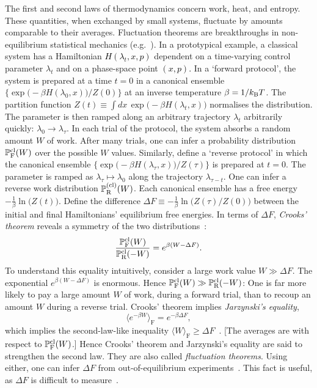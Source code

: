 \documentclass[%
 reprint,
superscriptaddress,
nofootinbib,
bibnotes,
 amsmath,amssymb,
 aps,
]{revtex4-1}
\theoremstyle{plain}
\newcommand{\Dave}[1]{\textcolor{black}{#1} }
\newcommand{\LParen}{ \bm{(} }
\newcommand{\RParen}{ \bm{)} }
\begin{document}
The first and second laws of thermodynamics concern work, heat, and entropy. These quantities, when exchanged by small systems, fluctuate by amounts comparable to their averages. Fluctuation theorems are breakthroughs in non-equilibrium statistical mechanics (e.g.~\cite{Jarzynski_equilibrium_1997, crooks_nonequilibrium_1998}).
In a prototypical example, a classical system 
has a Hamiltonian \Dave{$H(\lambda_t,x,p)$} dependent on a time-varying control parameter $\lambda_t$ and on a phase-space point \Dave{$(x,p)$.}
In a `forward protocol', the system is
prepared at a time $t=0$ in a canonical ensemble 
$\{\exp\LParen-\beta H(\lambda_0, x)\RParen/Z(0)\}$ at an inverse temperature $\beta = 1/k_{\rm B}T$. 
The partition function $Z(t)\equiv \int dx \, \exp\LParen-\beta H(\lambda_t, x)\RParen$ normalises the distribution.
The parameter is then ramped  
along an arbitrary trajectory $\lambda_t$ arbitrarily quickly: $\lambda_0 \rightarrow \lambda_\tau$.
In each trial of the protocol, 
the system absorbs a random amount $W$ of work.
After many trials, one can infer a probability distribution $\mathbb{P}_{\rm F}^{\rm cl}(W)$
over the possible $W$ values.
Similarly, define a `reverse protocol' in which the canonical ensemble $\{\exp\LParen-\beta H(\lambda_\tau, x)\RParen/Z(\tau)\}$ is prepared at $t=0$. 
The parameter is ramped as $\lambda_\tau\mapsto \lambda_0$ along the trajectory $\lambda_{\tau-t}$.
One can infer a reverse work distribution $\mathbb{P}_{\rm R}^{(\rm cl)}(W)$.
Each canonical ensemble has a free energy $- \frac{1}{\beta} \ln\LParen Z(t)\RParen$.
Define the difference $\Delta F \equiv -\frac{1}{\beta} \ln \LParen Z(\tau)/Z(0)\RParen$ between the initial and final Hamiltonians' equilibrium free energies.
In terms of $\Delta F$, \emph{Crooks' theorem} reveals a symmetry of the two distributions~\cite{crooks_nonequilibrium_1998}: 
\begin{equation}
\label{eq:crooks}
    \frac{ \mathbb{P}_{\rm F}^{\rm cl}(W)}{ 
             \mathbb{P}_{\rm R}^{\rm cl}(-W)}  
   = e^{\beta (W- \Delta F)}.
\end{equation}
To understand this equality intuitively, consider a large work value $W \gg \Delta F$. The exponential $e^{\beta (W- \Delta F)}$ is enormous. Hence 
$\mathbb{P}_{\rm F}^{\rm cl}(W) \gg \mathbb{P}_{\rm R}^{\rm cl}(-W)$: One is far more likely to pay a large amount $W$ of work, during a forward trial, than to recoup an amount $W$ during a reverse trial.
Crooks' theorem implies  \emph{Jarzynski's equality}, 
\begin{equation}
\label{Eq:JarzEq}
\langle e^{-\beta W} \rangle_{\mathrm{F}} = e^{-\beta \Delta F} ,
\end{equation}
 which implies the second-law-like inequality $\langle W \rangle_{\mathrm{F}} \ge \Delta F$~\cite{Jarzynski_equilibrium_1997, Collin_verification_2005}. [The averages are with respect to 
$\mathbb{P}_{\rm F}^{\rm cl}(W)$.]
Hence Crooks' theorem and Jarzynski's equality are said to strengthen the second law.
They are also called \emph{fluctuation theorems}. Using either, one can infer $\Delta F$ from out-of-equilibrium experiments~\cite{Liphardt_equilibrium_2002}. This fact is useful, as $\Delta F$ is difficult to measure~\cite{Pohorille_10_Good}.
\end{document}
